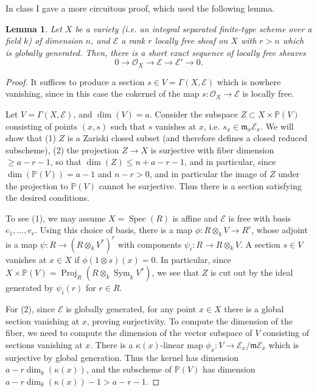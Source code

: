 \documentclass[10pt]{article}
\newtheorem{lemma}[thm]{Lemma}
\theoremstyle{definition}
\DeclareMathOperator{\Spec}{Spec}
\DeclareMathOperator{\Sym}{Sym}
\DeclareMathOperator{\Proj}{Proj}
\newcommand{\mf}{\mathfrak}
\newcommand{\PP}{\mathbb{P}}
\newcommand{\OO}{\mathcal{O}}
\newcommand{\rihgtarrow}{\rightarrow}
\begin{document}
In class I gave a more circuitous proof, which used the following lemma.
\begin{lemma}
Let $X$ be a variety (i.e. an integral separated finite-type scheme over a field $k$) of dimension $n$, and $\mathcal{E}$ a rank $r$ locally free sheaf on $X$ with $r > n$ which is globally generated.  Then, there is a short exact sequence of locally free sheaves
$$0 \rightarrow \OO_X \rightarrow \mathcal{E} \rightarrow \mathcal{E}' \rightarrow 0.$$
\end{lemma}
\begin{proof}
It suffices to produce a section $s \in V = \Gamma(X, \mathcal{E})$ which is nowhere vanishing, since in this case the cokernel of the map $s: \OO_X \rightarrow \mathcal{E}$ is locally free.

Let $V = \Gamma(X, \mathcal{E})$, and $\dim(V) = a$.  Consider the subspace $Z \subset X \times \PP(V)$ consisting of points $(x, s)$ such that $s$ vanishes at $x$, i.e. $s_x \in \mathfrak{m}_x \mathcal{E}_x$.  We will show that (1) $Z$ is a Zariski closed subset (and therefore defines a closed reduced subscheme), (2) the projection $Z \rightarrow X$ is surjective with fiber dimension $\geq a - r - 1$, so that $\dim(Z) \leq n + a - r - 1$, and in particular, since $\dim(\PP(V)) = a-1$ and $n - r > 0$, and in particular the image of $Z$ under the projection to $\PP(V)$ cannot be surjective.  Thus there is a section satisfying the desired conditions.


To see (1), we may assume $X = \Spec(R)$ is affine and $\mathcal{E}$ is free with basis $e_1, \ldots, e_r$.  Using this choice of basis, there is a map $\phi: R \otimes_k V \rightarrow R^r$, whose adjoint is a map $\psi: R \rihgtarrow (R \otimes_k V^*)^r$ with components $\psi_i: R \rightarrow R \otimes_k V$.  A section $s \in V$ vanishes at $x \in X$ if $\phi(1 \otimes s)(x) = 0$.  In particular, since $X \times \PP(V) = \Proj_R (R \otimes_k \Sym_k V^*)$, we see that $Z$ is cut out by the ideal generated by $\psi_i(r)$ for $r \in R$.

For (2), since $\mathcal{E}$ is globally generated, for any point $x \in X$ there is a global section vanishing at $x$, proving surjectivity.  To compute the dimension of the fiber, we need to compute the dimension of the vector subspace of $V$ consisting of sections vanishing at $x$.  There is a $\kappa(x)$-linear map $\phi_x: V \rightarrow \mathcal{E}_x/\mf{m}\mathcal{E}_x$ which is surjective by global generation.  Thus the kernel has dimension $a - r \dim_k(\kappa(x))$, and the subscheme of $\PP(V)$ has dimension $a-r\dim_k(\kappa(x))-1 > a - r - 1$.
\end{proof}
\end{document}
